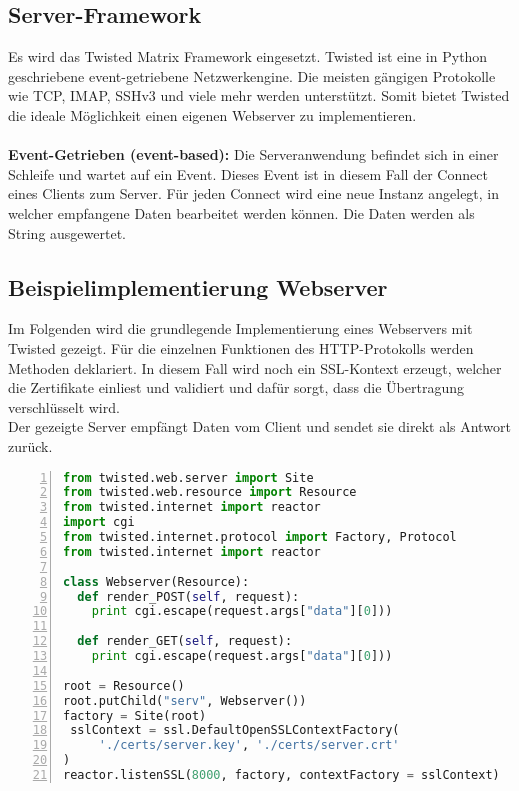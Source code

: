 \subsection{Server-Framework}
Es wird das Twisted Matrix Framework\cite{twisted} eingesetzt. Twisted ist eine in Python geschriebene event-getriebene Netzwerkengine. Die meisten gängigen Protokolle wie TCP, IMAP, SSHv3 und viele mehr werden unterstützt. Somit bietet Twisted die ideale Möglichkeit einen eigenen Webserver zu implementieren. \\\\
\textbf{Event-Getrieben (event-based):} Die Serveranwendung befindet sich in einer Schleife und wartet auf ein Event. Dieses Event ist in diesem Fall der Connect eines Clients zum Server. Für jeden Connect wird eine neue Instanz angelegt, in welcher empfangene Daten bearbeitet werden können. Die Daten werden als String ausgewertet.

\subsection{Beispielimplementierung Webserver}
Im Folgenden wird die grundlegende Implementierung eines Webservers mit Twisted gezeigt. Für die einzelnen Funktionen des HTTP-Protokolls werden Methoden deklariert. In diesem Fall wird noch ein SSL-Kontext erzeugt, welcher die Zertifikate einliest und validiert und dafür sorgt, dass die Übertragung verschlüsselt wird. \\
Der gezeigte Server empfängt Daten vom Client und sendet sie direkt als Antwort zurück.

\begin{lstlisting}[caption =Testcode Echoserver mit Twisted Framework, language=python, frame=single, breaklines=true,columns=fullflexible, commentstyle=\color{gray}\upshape, captionpos=b, numbers = left]
from twisted.web.server import Site
from twisted.web.resource import Resource
from twisted.internet import reactor
import cgi
from twisted.internet.protocol import Factory, Protocol
from twisted.internet import reactor

class Webserver(Resource):
  def render_POST(self, request):
	print cgi.escape(request.args["data"][0]))

  def render_GET(self, request):
	print cgi.escape(request.args["data"][0]))

root = Resource()
root.putChild("serv", Webserver())
factory = Site(root)
 sslContext = ssl.DefaultOpenSSLContextFactory(
     './certs/server.key', './certs/server.crt'
)
reactor.listenSSL(8000, factory, contextFactory = sslContext)
\end{lstlisting}

